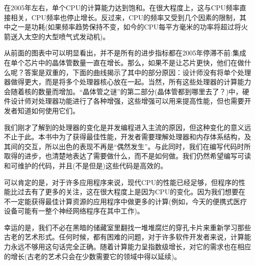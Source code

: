 在2005年左右，单个CPU的计算能力达到饱和。在很大程度上，这与CPU频率直接相关，CPU频率也停止增长。反过来，CPU的频率又受到几个因素的限制，其中之一是功耗(如果频率趋势保持不变，如今的CPU每平方毫米的功率将超过将火箭送入太空的大型喷气式发动机)。

从前面的图表中可以明显看出，并不是所有的进步指标都在2005年停滞不前:集成在单个芯片中的晶体管数量一直在增长。那么，如果不是让芯片更快，他们在做什么呢？答案是双重的，下面的曲线揭示了其中的部分原因：设计师没有将单个处理器做得更大，而是将多个处理器核心放在一起。当然，所有这些处理器的计算能力会随着核的数量而增加。“晶体管之谜”的第二部分(晶体管都到哪里去了？)中，硬件设计师对处理器功能进行了各种增强，这些增强可以用来提高性能，但也需要开发者知道如何使用它们。

我们刚才了解到的处理器的变化是并发编程进入主流的原因，但这种变化的意义远不止于此。本书中为了获得最佳性能，开发者需要理解处理器和内存体系结构，及其间的交互，所以出色的表现不再是“偶然发生”。与此同时，我们在编写代码时所取得的进步，也清楚地表达了需要做什么，而不是如何做。我们仍然希望编写可读和可维护的代码，并且(不是但是)这些代码是高效的。

可以肯定的是，对于许多应用程序来说，现代CPU的性能已经足够，但程序的性能比过去有了更多的关注，这在很大程度上是因为CPU的变化。因为我们想要在不一定能获得最佳计算资源的应用程序中做更多的计算(例如，今天的便携式医疗设备可能有一整个神经网络程序在其中工作)。

幸运的是，我们不必在黑暗的储藏室里翻找一堆堆腐烂的穿孔卡片来重新学习那些古老的艺术形式。任何时候，都有困难的问题，对于许多软件开发者来说，计算能力永远不够用这句话完全正确。随着计算能力呈指数级增长，对它的需求也在相应的增长(古老的艺术只会在少数需要它的领域中得以延续)。











